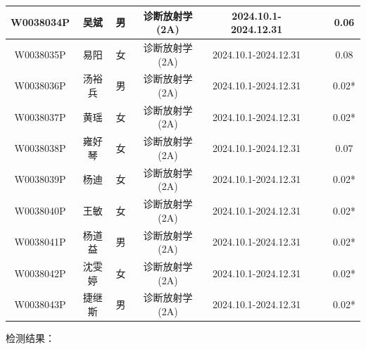 \begin{table}[H]
\begin{tabular}{|c|c|c|c|c|c|c|c|}
\hline
W0038034P & 吴斌 & 男 & 诊断放射学(2A) & 2024.10.1-2024.12.31 &  &  & 0.06 \\
\hline
W0038035P & 易阳 & 女 & 诊断放射学(2A) & 2024.10.1-2024.12.31 &  &  & 0.08 \\
\hline
W0038036P & 汤裕兵 & 男 & 诊断放射学(2A) & 2024.10.1-2024.12.31 &  &  & 0.02* \\
\hline
W0038037P & 黄瑶 & 女 & 诊断放射学(2A) & 2024.10.1-2024.12.31 &  &  & 0.02* \\
\hline
W0038038P & 雍好琴 & 女 & 诊断放射学(2A) & 2024.10.1-2024.12.31 &  &  & 0.07 \\
\hline
W0038039P & 杨迪 & 女 & 诊断放射学(2A) & 2024.10.1-2024.12.31 &  &  & 0.02* \\
\hline
W0038040P & 王敏 & 女 & 诊断放射学(2A) & 2024.10.1-2024.12.31 &  &  & 0.02* \\
\hline
W0038041P & 杨道益 & 男 & 诊断放射学(2A) & 2024.10.1-2024.12.31 &  &  & 0.02* \\
\hline
W0038042P & 沈雯婷 & 女 & 诊断放射学(2A) & 2024.10.1-2024.12.31 &  &  & 0.02* \\
\hline
W0038043P & 捷继斯 & 男 & 诊断放射学(2A) & 2024.10.1-2024.12.31 &  &  & 0.02* \\
\hline
\end{tabular}
\end{table}


检测结果：


